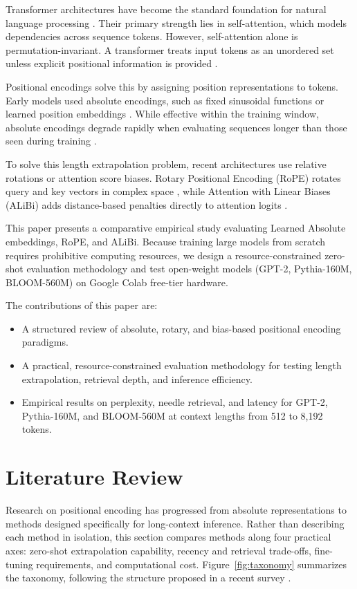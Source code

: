 \documentclass[conference]{IEEEtran}
\begin{document}
Transformer architectures have become the standard foundation for natural language processing \cite{vaswani2017,touvron2023}. Their primary strength lies in self-attention, which models dependencies across sequence tokens. However, self-attention alone is permutation-invariant. A transformer treats input tokens as an unordered set unless explicit positional information is provided \cite{vaswani2017}.

Positional encodings solve this by assigning position representations to tokens. Early models used absolute encodings, such as fixed sinusoidal functions or learned position embeddings \cite{vaswani2017,devlin2019,radford2019}. While effective within the training window, absolute encodings degrade rapidly when evaluating sequences longer than those seen during training \cite{press2022}.

To solve this length extrapolation problem, recent architectures use relative rotations or attention score biases. Rotary Positional Encoding (RoPE) rotates query and key vectors in complex space \cite{su2024roformer}, while Attention with Linear Biases (ALiBi) adds distance-based penalties directly to attention logits \cite{press2022}.

This paper presents a comparative empirical study evaluating Learned Absolute embeddings, RoPE, and ALiBi. Because training large models from scratch requires prohibitive computing resources, we design a resource-constrained zero-shot evaluation methodology and test open-weight models (GPT-2, Pythia-160M, BLOOM-560M) on Google Colab free-tier hardware.

The contributions of this paper are:
\begin{itemize}
\item A structured review of absolute, rotary, and bias-based positional encoding paradigms.
\item A practical, resource-constrained evaluation methodology for testing length extrapolation, retrieval depth, and inference efficiency.
\item Empirical results on perplexity, needle retrieval, and latency for GPT-2, Pythia-160M, and BLOOM-560M at context lengths from 512 to 8,192 tokens.
\end{itemize}

\section{Literature Review}
\label{sec:literature}

Research on positional encoding has progressed from absolute representations to methods designed specifically for long-context inference. Rather than describing each method in isolation, this section compares methods along four practical axes: zero-shot extrapolation capability, recency and retrieval trade-offs, fine-tuning requirements, and computational cost. Figure~\ref{fig:taxonomy} summarizes the taxonomy, following the structure proposed in a recent survey \cite{zhao2024survey}.
\end{document}
